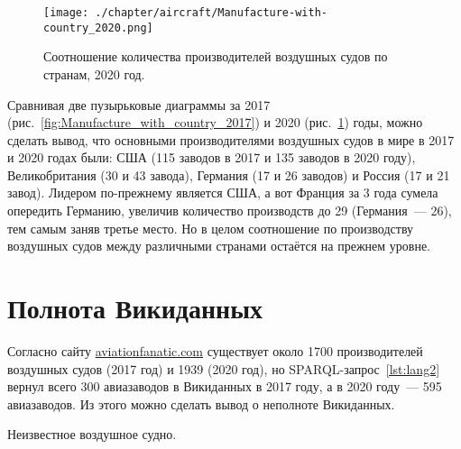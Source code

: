 \begin{figure}[h!]
\centering
	\texttt{[image: ./chapter/aircraft/Manufacture-with-country\_2020.png]}
	\caption{Соотношение количества производителей воздушных судов по странам, 2020 год.}
	\label{fig:Manufacture_with_country_2020}
\end{figure}

\label{fig:Manufacture_with_country_2017_2}

Сравнивая две пузырьковые диаграммы за 2017 (рис.~\ref{fig:Manufacture_with_country_2017}) и 2020 (рис.~\ref{fig:Manufacture_with_country_2020}) годы, можно сделать вывод, что основными производителями воздушных судов в мире 
в 2017 и 2020 годах были: США (115 заводов в 2017 и 135 заводов в 2020 году), Великобритания (30 и 43 завода), Германия (17 и 26 заводов) и Россия (17 и 21 завод). Лидером по-прежнему является США, а вот Франция за 3 года сумела опередить Германию, увеличив количество производств до 29 (Германия~--- 26), тем самым заняв третье место. Но в целом соотношение по производству воздушных судов между различными странами остаётся на прежнем уровне.

\section{Полнота Викиданных}

Согласно сайту \href{https://www.aviationfanatic.com/}{aviationfanatic.com} 
существует около \num{1700} 
производителей воздушных судов\autocite{count_of_aircraft_manufactures} (2017 год) 
и \num{1939} (2020 год), 
но SPARQL-запрос~\ref{lst:lang2} вернул всего 300 авиазаводов в Викиданных в 2017 году, 
а в 2020 году~--- 595 авиазаводов. Из этого можно сделать вывод о неполноте Викиданных.  

\label{aircraft_question_5}


\begin{marginfigure}[0.0cm]
{%
\setlength{\fboxsep}{0pt}%
\setlength{\fboxrule}{1pt}%
%
}
  \caption{Неизвестное воздушное судно.}%
  \label{fig:airship_question_aircraft}%
\end{marginfigure}

